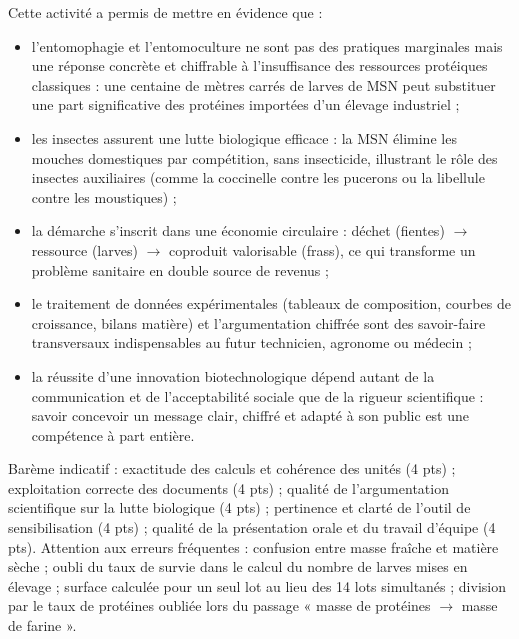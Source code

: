 \documentclass[11pt]{article}
\newcommand{\cle}[1]{{\popxbold\color{popdark}#1}}
\newcounter{popsec}
\newcounter{popsub}
\newcommand{\courssub}[1]{%
  \stepcounter{popsub}%
  \par\vspace{9pt}\noindent{\popxbold\fontsize{11.5}{13}\selectfont\color{popink}{\color{poporange}\thepopsec.\thepopsub}\hspace{6pt}#1}\par\nopagebreak\vspace{4pt}
}
\begin{document}
\courssub{Bilan de l'activité}

Cette activité a permis de mettre en évidence que :

\begin{itemize}
\item l'\cle{entomophagie} et l'\cle{entomoculture} ne sont pas des pratiques marginales mais une réponse concrète et chiffrable à l'insuffisance des ressources protéiques classiques : une centaine de mètres carrés de larves de MSN peut substituer une part significative des protéines importées d'un élevage industriel ;
\item les insectes assurent une \cle{lutte biologique} efficace : la MSN élimine les mouches domestiques par compétition, sans insecticide, illustrant le rôle des insectes auxiliaires (comme la coccinelle contre les pucerons ou la libellule contre les moustiques) ;
\item la démarche s'inscrit dans une \cle{économie circulaire} : déchet (fientes) $\rightarrow$ ressource (larves) $\rightarrow$ coproduit valorisable (frass), ce qui transforme un problème sanitaire en double source de revenus ;
\item le traitement de données expérimentales (tableaux de composition, courbes de croissance, bilans matière) et l'argumentation chiffrée sont des savoir-faire transversaux indispensables au futur technicien, agronome ou médecin ;
\item la réussite d'une innovation biotechnologique dépend autant de la \cle{communication} et de l'acceptabilité sociale que de la rigueur scientifique : savoir concevoir un message clair, chiffré et adapté à son public est une compétence à part entière.
\end{itemize}

\begin{attention}
Barème indicatif : exactitude des calculs et cohérence des unités (4 pts) ; exploitation correcte des documents (4 pts) ; qualité de l'argumentation scientifique sur la lutte biologique (4 pts) ; pertinence et clarté de l'outil de sensibilisation (4 pts) ; qualité de la présentation orale et du travail d'équipe (4 pts). Attention aux erreurs fréquentes : confusion entre masse fraîche et matière sèche ; oubli du taux de survie dans le calcul du nombre de larves mises en élevage ; surface calculée pour un seul lot au lieu des 14 lots simultanés ; division par le taux de protéines oubliée lors du passage « masse de protéines $\rightarrow$ masse de farine ».
\end{attention}
\end{document}
